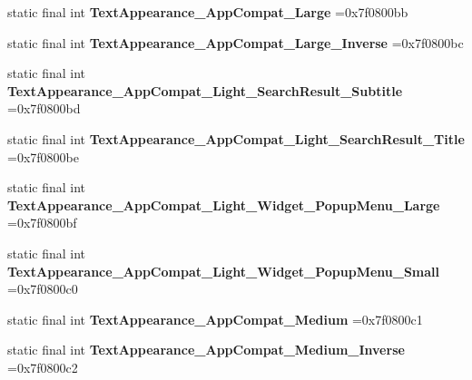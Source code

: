 \begin{DoxyCompactItemize}
\item 
\hypertarget{classcheck_1_1test_1_1_r_1_1style_a07774b2c9a931aab335fdb8925566a3b}{}static final int {\bfseries Text\+Appearance\+\_\+\+App\+Compat\+\_\+\+Large} =0x7f0800bb\label{classcheck_1_1test_1_1_r_1_1style_a07774b2c9a931aab335fdb8925566a3b}

\item 
\hypertarget{classcheck_1_1test_1_1_r_1_1style_af2e57a2a7af503e73ba36fc941770c79}{}static final int {\bfseries Text\+Appearance\+\_\+\+App\+Compat\+\_\+\+Large\+\_\+\+Inverse} =0x7f0800bc\label{classcheck_1_1test_1_1_r_1_1style_af2e57a2a7af503e73ba36fc941770c79}

\item 
\hypertarget{classcheck_1_1test_1_1_r_1_1style_a40a51a48e61a7141b68ede84b873ad47}{}static final int {\bfseries Text\+Appearance\+\_\+\+App\+Compat\+\_\+\+Light\+\_\+\+Search\+Result\+\_\+\+Subtitle} =0x7f0800bd\label{classcheck_1_1test_1_1_r_1_1style_a40a51a48e61a7141b68ede84b873ad47}

\item 
\hypertarget{classcheck_1_1test_1_1_r_1_1style_a8094c8db912c371015ee8eab210e76c7}{}static final int {\bfseries Text\+Appearance\+\_\+\+App\+Compat\+\_\+\+Light\+\_\+\+Search\+Result\+\_\+\+Title} =0x7f0800be\label{classcheck_1_1test_1_1_r_1_1style_a8094c8db912c371015ee8eab210e76c7}

\item 
\hypertarget{classcheck_1_1test_1_1_r_1_1style_acc28f4faa3ab3855ff50615aff0d0931}{}static final int {\bfseries Text\+Appearance\+\_\+\+App\+Compat\+\_\+\+Light\+\_\+\+Widget\+\_\+\+Popup\+Menu\+\_\+\+Large} =0x7f0800bf\label{classcheck_1_1test_1_1_r_1_1style_acc28f4faa3ab3855ff50615aff0d0931}

\item 
\hypertarget{classcheck_1_1test_1_1_r_1_1style_ae9fd1e0ae24b7c26448fcda7af8a871d}{}static final int {\bfseries Text\+Appearance\+\_\+\+App\+Compat\+\_\+\+Light\+\_\+\+Widget\+\_\+\+Popup\+Menu\+\_\+\+Small} =0x7f0800c0\label{classcheck_1_1test_1_1_r_1_1style_ae9fd1e0ae24b7c26448fcda7af8a871d}

\item 
\hypertarget{classcheck_1_1test_1_1_r_1_1style_a61d09d169cc02f57f22d418156a886d1}{}static final int {\bfseries Text\+Appearance\+\_\+\+App\+Compat\+\_\+\+Medium} =0x7f0800c1\label{classcheck_1_1test_1_1_r_1_1style_a61d09d169cc02f57f22d418156a886d1}

\item 
\hypertarget{classcheck_1_1test_1_1_r_1_1style_a8b91ec9d5622fb2ca6b1f565b813b5a9}{}static final int {\bfseries Text\+Appearance\+\_\+\+App\+Compat\+\_\+\+Medium\+\_\+\+Inverse} =0x7f0800c2\label{classcheck_1_1test_1_1_r_1_1style_a8b91ec9d5622fb2ca6b1f565b813b5a9}


\end{DoxyCompactItemize}
